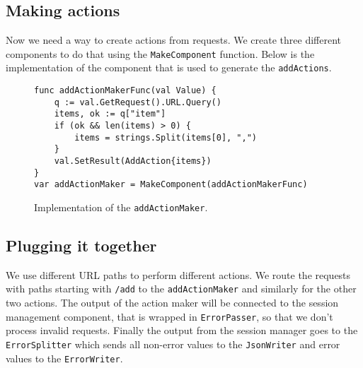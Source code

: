 \subsection{Making actions}
Now we need a way to create actions from requests. We create three different
components to do that using the \texttt{MakeComponent} function. Below
is the implementation of the component that is used to generate 
the \texttt{addActions}.
\begin{figure}[h]
\begin{lstlisting}
func addActionMakerFunc(val Value) {
    q := val.GetRequest().URL.Query()
    items, ok := q["item"]
    if (ok && len(items) > 0) {
        items = strings.Split(items[0], ",")
    }
    val.SetResult(AddAction{items})
}
var addActionMaker = MakeComponent(addActionMakerFunc) 
\end{lstlisting}
\caption[scale=1.0]{Implementation of the \texttt{addActionMaker}.}
\label{fig:addActionMaker}
\end{figure}

\newpage
\subsection{Plugging it together}
We use different URL paths to perform different actions. We route the 
requests with paths starting with \texttt{/add} to the \texttt{addActionMaker}
and similarly for the other two actions. The output of the action maker
will be connected to the session management component, that is wrapped in
\texttt{ErrorPasser}, so that we don't process invalid requests.
Finally the output from the session manager goes to the \texttt{ErrorSplitter}
which sends all non-error values to the \texttt{JsonWriter} and error
values to the \texttt{ErrorWriter}. 

